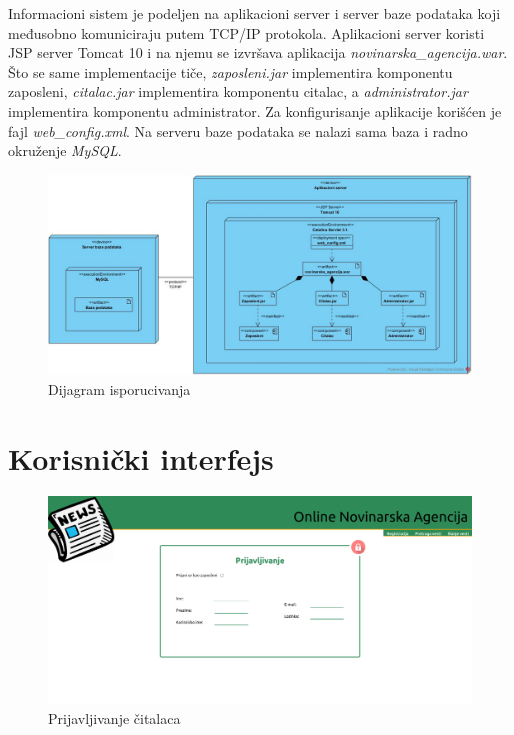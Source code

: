 \documentclass{article}
\begin{document}
\newpage

\newpage

Informacioni sistem je podeljen na aplikacioni server i server baze podataka koji međusobno komuniciraju putem TCP/IP protokola. Aplikacioni server koristi JSP server Tomcat 10 i na njemu se izvršava aplikacija \textit{novinarska\_agencija.war}.
Što se same implementacije tiče, \textit{zaposleni.jar} implementira komponentu zaposleni, \textit{citalac.jar} implementira komponentu citalac, a \textit{administrator.jar} implementira komponentu administrator. Za konfigurisanje aplikacije korišćen je fajl
\textit{web\_config.xml}. Na serveru baze podataka se nalazi sama baza i radno okruženje \textit{MySQL}. 

\begin{figure}[htbp!]
    \centering
    \includegraphics[scale=0.36]{Dijagram_isporucivanja.jpg}
    \caption{Dijagram isporucivanja}
    \label{slk:dtp}
\end{figure}


\newpage
\section{Korisnički interfejs}

\begin{figure}[htbp!]
    \centering
    \includegraphics[scale=0.23]{PrijavaCitalaca.png}
    \caption{Prijavljivanje čitalaca}
    \label{slk:dtp}
\end{figure}
\end{document}
